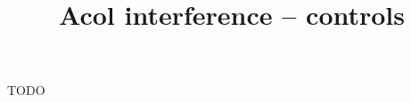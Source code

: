 \documentclass[12pt, a4paper]{article}
\title{Acol interference -- controls}
\author{}
\begin{document}
\maketitle


TODO

\end{document}
